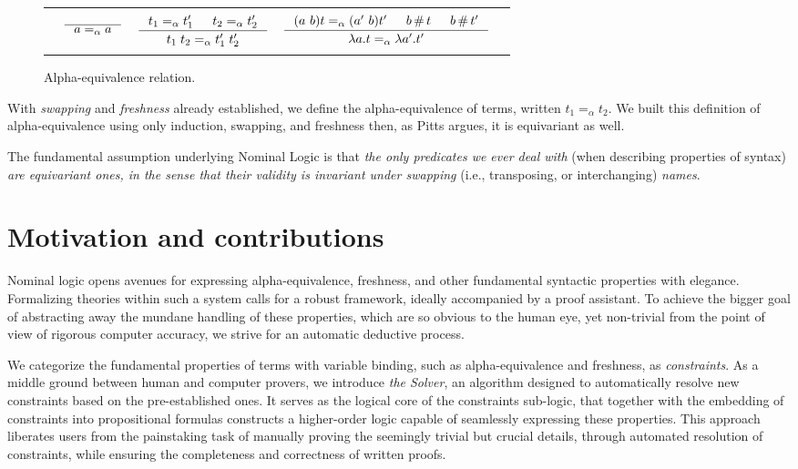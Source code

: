 \documentclass[english, mgr]{iithesis}
\renewcommand{\it}[1]{\textit{#1}}
\newcommand{\aequiv}{\ensuremath{=_\alpha}}
\begin{document}
\begin{figure}[htbp]
  \centering
    \begin{tabularx}{\textwidth}{|ccCcc|}
    \hline & & & & \\ {} &
    $
    \inference{
      \text{}
    }{
      a \aequiv a
    }
    $ & $
    \inference{
      t_1 \aequiv t_1' & t_2 \aequiv t_2'
    }{
      t_1\;t_2 \aequiv t_1'\;t_2'
    }
    $ & $
    \inference{
      \permswap{a}{b}{t} \aequiv \permswap{a'}{b}{t'} & b \cfresh t & b \cfresh t'
    }{
      \lambda a . t \aequiv \lambda a' . t'
    }
    $ & {} \\ & & & & \\ \hline
    \end{tabularx}
  \caption{Alpha-equivalence relation.}
  \label{fig:fresh}
\end{figure}
With \it{swapping} and \it{freshness} already established,
we define the alpha-equivalence of terms, written $t_1 \aequiv t_2$.
We built this definition of alpha-equivalence using only induction,
swapping, and freshness then, as Pitts argues, it is equivariant as well.
\\
\begin{mdframed}[frametitle={\textnormal{\footnotesize \textbf{\citeauthor{nominal-logic}}, \textit{\citetitle{nominal-logic}}\cite{nominal-logic}:}}]
The fundamental assumption underlying Nominal Logic is that \textit{the only predicates we ever deal with} (when describing properties of syntax) \textit{are equivariant ones, in the sense that their validity is invariant under swapping} (i.e., transposing, or interchanging) \textit{names}.
\end{mdframed}

\section{Motivation and contributions}
Nominal logic opens avenues for expressing alpha-equivalence, freshness, and
other fundamental syntactic properties with elegance.
Formalizing theories within such a system calls for
a robust framework, ideally accompanied by a proof assistant.
To achieve the bigger goal of abstracting away the mundane handling of these
properties, which are so obvious to the human eye,
yet non-trivial from the point of view of rigorous computer accuracy,
we strive for an automatic deductive process.

We categorize the fundamental properties of terms with variable binding,
such as alpha-equivalence and freshness, as \it{constraints}.
As a middle ground between human and computer provers,
we introduce \it{the Solver}, an algorithm designed to automatically
resolve new constraints based on the pre-established ones.
It serves as the logical core of the constraints sub-logic,
that together with the embedding of constraints into propositional formulas
constructs a higher-order logic capable of seamlessly expressing these properties.
This approach liberates users from the painstaking task of manually proving the seemingly trivial but crucial details,
through automated resolution of constraints,
while ensuring the completeness and correctness of written proofs.
\end{document}
